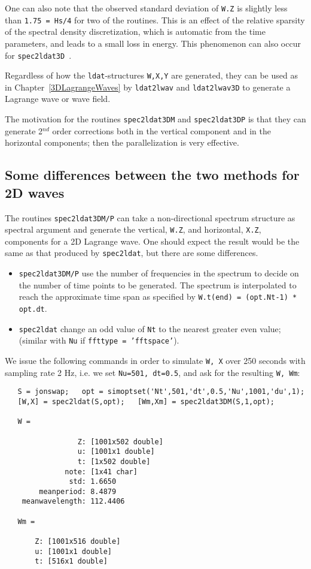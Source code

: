 One can also note that the observed standard deviation of {\tt W.Z} is slightly less than 
{\tt 1.75 = Hs/4} for two of the routines. This is an effect of the relative sparsity of the spectral density discretization, which is automatic from the time parameters, and leads to a small loss in energy.  This phenomenon can also occur for {\tt spec2ldat3D }. 

Regardless of how the {\tt ldat}-structures {\tt W,X,Y} are generated, they can be used as in Chapter~\ref{3DLagrangeWaves} by 
{\tt ldat2lwav} and {\tt ldat2lwav3D} to generate a Lagrange wave or wave field. 

The motivation for the routines {\tt spec2ldat3DM} and {\tt spec2ldat3DP} is that they can generate 2$^{nd}$ order corrections both in the vertical component and in the horizontal components; then the parallelization is very effective. 

\subsection{Some differences between the two methods for 2D waves} 
The routines {\tt spec2ldat3DM/P} can take a non-directional spectrum structure as spectral argument and generate the vertical, {\tt W.Z}, and horizontal, {\tt X.Z}, components for a 2D Lagrange wave. One should expect the result would be the same as that produced by {\tt spec2ldat}, but there are some differences. 
\begin{itemize}
\item {\tt spec2ldat3DM/P} use the number of frequencies in the spectrum to decide on the number of time points to be generated. The spectrum is interpolated to reach the approximate time span as specified by {\tt W.t(end) = (opt.Nt-1) * opt.dt}.
\item {\tt spec2ldat} change an odd value of {\tt Nt} to the nearest greater even value; (similar with {\tt Nu} if {\tt ffttype = 'fftspace'}). 
\end{itemize}

We issue the following commands in order to simulate {\tt W, X} over 250 seconds with sampling rate 2 Hz, i.e. we set {\tt Nu=501, dt=0.5}, and ask for the resulting {\tt W, Wm}: 
{\small\begin{verbatim}
   S = jonswap;   opt = simoptset('Nt',501,'dt',0.5,'Nu',1001,'du',1);
   [W,X] = spec2ldat(S,opt);   [Wm,Xm] = spec2ldat3DM(S,1,opt);

   W = 

                 Z: [1001x502 double]     
                 u: [1001x1 double]
                 t: [1x502 double]
              note: [1x41 char]
               std: 1.6650
        meanperiod: 8.4879
    meanwavelength: 112.4406

   Wm = 

       Z: [1001x516 double]
       u: [1001x1 double]
       t: [516x1 double]
\end{verbatim}}


